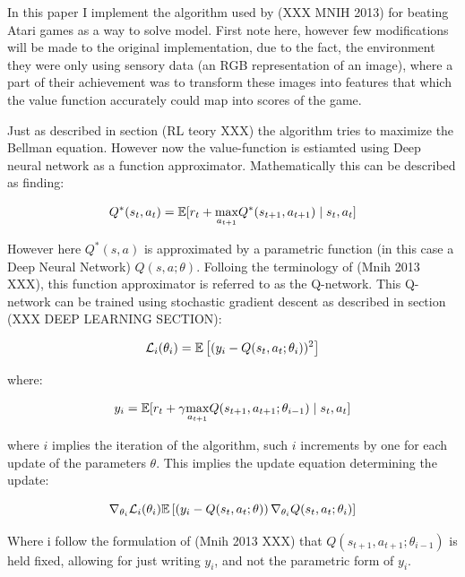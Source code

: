 In this paper I implement the algorithm used by (XXX MNIH 2013) for beating Atari games as a way to solve model. First note here, however few modifications will be made to the original implementation, due to the fact, the environment they were only using sensory data (an RGB representation of an image), where a part of their achievement was to transform these images into features that which the value function accurately could map into scores of the game. 

Just as described in section (RL teory XXX) the algorithm tries to maximize the Bellman equation. However now the value-function is estiamted using Deep neural network as a function approximator. Mathematically this can be described as finding:

\begin{equation}
    Q^*(s_t,a_t) = \mathbb{E} [r_t + \underset{a_{t+1}}{\max}  Q^*(s_{t+1}, a_{t+1}) \mid s_t, a_t]
\end{equation}

However here $Q^*(s, a)$ is approximated by a parametric function (in this case a Deep Neural Network) $Q(s, a ; \theta)$. Folloing the terminology of (Mnih 2013 XXX), this function approximator is referred to as the Q-network. This Q-network can be trained using stochastic gradient descent as described in section (XXX DEEP LEARNING SECTION):

\begin{equation}
    \mathcal{L}_i(\theta_i) = \mathbb{E} \left[ (y_i - Q(s_t, a_t ; \theta_i))^2 \right]
\end{equation}

where:

\begin{equation}
    y_i = \mathbb{E} [r_t + \gamma \underset{a_{t+1}}\max Q(s_{t+1}, a_{t+1}; \theta_{i-1}) \mid s_t, a_t ]
\end{equation}

where $i$ implies the iteration of the algorithm, such $i$ increments by one for each update of the parameters $\theta$. This implies the update equation determining the update:

\begin{equation}
    \nabla_{\theta_i} \mathcal{L}_i (\theta_i)  \mathbb{E} \left[ \left( y_i - Q(s_t, a_t ; \theta) \right) \nabla_{\theta_i} Q(s_t, a_t; \theta_i) \right]
\end{equation}

Where i follow the formulation of (Mnih 2013 XXX) that $Q(s_{t+1}, a_{t+1}; \theta_{i-1})$ is held fixed, allowing for just writing $y_i$, and not the parametric form of $y_i$.

